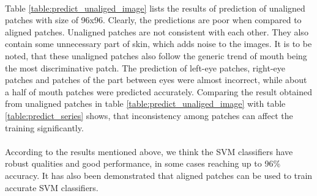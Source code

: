 \\
Table \ref{table:predict_unaliged_image} lists the results of prediction of unaligned patches with size of 96x96. Clearly, the predictions are poor when compared to aligned patches. Unaligned patches are not consistent with each other. They also contain some unnecessary part of skin, which adds noise to the images. It is to be noted, that these unaligned patches also follow the generic trend of mouth being the most discriminative patch. The prediction of left-eye patches, right-eye patches and patches of the part between eyes were almost incorrect, while about a half of mouth patches were predicted accurately. Comparing the result obtained from unaligned patches in table \ref{table:predict_unaliged_image} with table \ref{table:predict_series} shows, that inconsistency among patches can affect the training significantly.
\\
\\
According to the results mentioned above, we think the SVM classifiers have robust qualities and good performance, in some cases reaching up to 96\% accuracy. It has also been demonstrated that aligned patches can be used to train accurate SVM classifiers.
